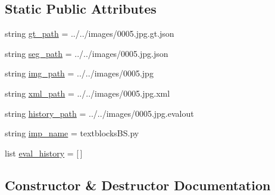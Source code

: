 \subsection*{Static Public Attributes}
\begin{DoxyCompactItemize}
\item 
string \hyperlink{class_eval_one_to_many_1_1_eval_one_to_many_a89bd4c83390185bad2e7e7e06366b6b8}{gt\+\_\+path} = \textquotesingle{}../../images/0005.jpg.\+gt.\+json\textquotesingle{}
\item 
string \hyperlink{class_eval_one_to_many_1_1_eval_one_to_many_a7141c5f130806abf06c5c164efae6880}{seg\+\_\+path} = \textquotesingle{}../../images/0005.jpg.\+json\textquotesingle{}
\item 
string \hyperlink{class_eval_one_to_many_1_1_eval_one_to_many_aac8f0299e8b1420596bb595a7a678a56}{img\+\_\+path} = \textquotesingle{}../../images/0005.jpg\textquotesingle{}
\item 
string \hyperlink{class_eval_one_to_many_1_1_eval_one_to_many_ae9ba6a76f1f0488e51746a887fb8895e}{xml\+\_\+path} = \textquotesingle{}../../images/0005.jpg.\+xml\textquotesingle{}
\item 
string \hyperlink{class_eval_one_to_many_1_1_eval_one_to_many_a2af9cb395298395805ae5b5fe93d02c1}{history\+\_\+path} = \textquotesingle{}../../images/0005.jpg.\+evalout\textquotesingle{}
\item 
string \hyperlink{class_eval_one_to_many_1_1_eval_one_to_many_a708fad0f3d2f8f3efc66c42eddc85e76}{imp\+\_\+name} = \textquotesingle{}textblocks\+B\+S.\+py\textquotesingle{}
\item 
list \hyperlink{class_eval_one_to_many_1_1_eval_one_to_many_a34fcb30000802e6c1c2c0ef3ad70194a}{eval\+\_\+history} = \mbox{[}$\,$\mbox{]}
\end{DoxyCompactItemize}


\subsection{Constructor \& Destructor Documentation}
\hypertarget{class_eval_one_to_many_1_1_eval_one_to_many_af1e44dca57d0358bfc91a411549b48c2}{}
